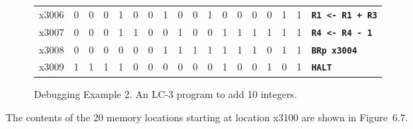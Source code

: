 \documentclass{patt}
\begin{document}
\begin{figure}[p]
\begin{minipage}{36pc}
\begin{center}
\begin{tabular}{@{}l c c c c c c c c c c c c c c c c l }
\cline{2-17}
x3006 & \multicolumn{1}{|c}{0} & 0 & 0 & \multicolumn{1}{c|}{1} & 0 & 0 & \multicolumn{1}{c|}{1} & 0 & 0 & \multicolumn{1}{c|}{1} & \multicolumn{1}{c|}{0} & 0 & \multicolumn{1}{c|}{0} & 0 & 1 & \multicolumn{1}{c|}{1} & \multicolumn{1}{l}{\tt\bfseries R1 <- R1 + R3} \\
\cline{2-17}
x3007 & \multicolumn{1}{|c}{0} & 0 & 0 & \multicolumn{1}{c|}{1} & 1 & 0 & \multicolumn{1}{c|}{0} & 1 & 0 & \multicolumn{1}{c|}{0} & \multicolumn{1}{c|}{1} & 1 & 1 & 1 & 1 & \multicolumn{1}{c|}{1} & \multicolumn{1}{l}{\tt\bfseries R4 <- R4 - 1} \\
\cline{2-17}
x3008 & \multicolumn{1}{|c}{0} & 0 & 0 & \multicolumn{1}{c|}{0} & 0 & 0 & \multicolumn{1}{c|}{1} & 1 & 1 &         1          &         1          & 1 & 1 & 0 & 1 & \multicolumn{1}{c|}{1} & \multicolumn{1}{l}{\tt\bfseries BRp x3004} \\
\cline{2-17}
x3009 & \multicolumn{1}{|c}{1} & 1 & 1 & \multicolumn{1}{c|}{1} & 0 & 0 & 0 & \multicolumn{1}{c|}{0} & 0 &         0          &         1          & 0 & 0 & 1 & 0 & \multicolumn{1}{c|}{1} & \multicolumn{1}{l}{\tt\bfseries HALT} \\
\cline{2-17}
\end{tabular}
\end{center}
\caption{Debugging Example 2.  An LC-3 program to add 10 integers.} 
\end{minipage}
\end{figure}

\FloatBarrier
The contents of the 20 memory locations starting at
location x3100 are shown in Figure~6.7.
\end{document}
